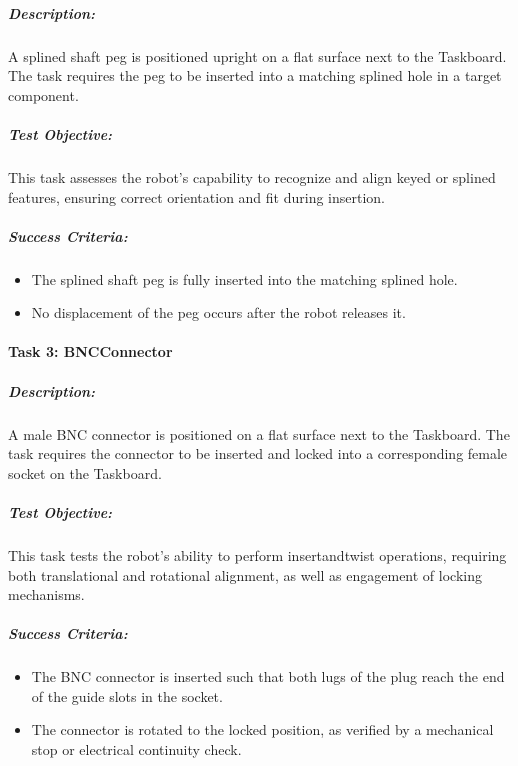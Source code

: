 \documentclass[letterpaper,10pt,english]{sphinxmanual}
\begin{document}
\subparagraph{Description:}
\label{\detokenize{robotic_instructions_peg_in_hole:id1}}
\sphinxAtStartPar
A splined shaft peg is positioned upright on a flat surface next to the Taskboard.
The task requires the peg to be inserted into a matching splined hole in a target component.


\subparagraph{Test Objective:}
\label{\detokenize{robotic_instructions_peg_in_hole:id2}}
\sphinxAtStartPar
This task assesses the robot’s capability to recognize and align keyed or splined features, ensuring correct orientation and fit during insertion.


\subparagraph{Success Criteria:}
\label{\detokenize{robotic_instructions_peg_in_hole:id3}}\begin{itemize}
\item {} 
\sphinxAtStartPar
The splined shaft peg is fully inserted into the matching splined hole.

\item {} 
\sphinxAtStartPar
No  displacement of the peg occurs after the robot releases it.

\end{itemize}


\paragraph{Task 3: BNC\sphinxhyphen{}Connector}
\label{\detokenize{robotic_instructions_peg_in_hole:task-3-bnc-connector}}

\subparagraph{Description:}
\label{\detokenize{robotic_instructions_peg_in_hole:id4}}
\sphinxAtStartPar
A male BNC connector is positioned on a flat surface next to the Taskboard.
The task requires the connector to be inserted and locked into a corresponding female socket on the Taskboard.


\subparagraph{Test Objective:}
\label{\detokenize{robotic_instructions_peg_in_hole:id5}}
\sphinxAtStartPar
This task tests the robot’s ability to perform insert\sphinxhyphen{}and\sphinxhyphen{}twist operations, requiring both translational and rotational alignment,
as well as engagement of locking mechanisms.


\subparagraph{Success Criteria:}
\label{\detokenize{robotic_instructions_peg_in_hole:id6}}\begin{itemize}
\item {} 
\sphinxAtStartPar
The BNC connector is inserted such that both lugs of the plug reach the end of the guide slots in the socket.

\item {} 
\sphinxAtStartPar
The connector is rotated to the locked position, as verified by a mechanical stop or electrical continuity check.

\end{itemize}
\end{document}
